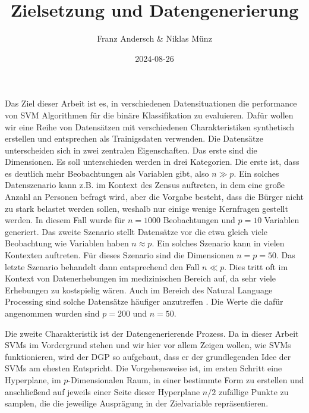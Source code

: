 \documentclass[
]{article}
\title{Zielsetzung und Datengenerierung}
\author{Franz Andersch \& Niklas Münz}
\date{2024-08-26}
\renewcommand{\maketitle}{}
\begin{document}
\maketitle

Das Ziel dieser Arbeit ist es, in verschiedenen Datensituationen die
performance von SVM Algorithmen für die binäre Klassifikation zu
evaluieren. Dafür wollen wir eine Reihe von Datensätzen mit
verschiedenen Charakteristiken synthetisch erstellen und entsprechen als
Trainigsdaten verwenden. Die Datensätze unterscheiden sich in zwei
zentralen Eigenschaften. Das erste sind die Dimensionen. Es soll
unterschieden werden in drei Kategorien. Die erste ist, dass es deutlich
mehr Beobachtungen als Variablen gibt, also \(n \gg p\). Ein solches
Datenszenario kann z.B. im Kontext des Zensus auftreten, in dem eine
große Anzahl an Personen befragt wird, aber die Vorgabe besteht, dass
die Bürger nicht zu stark belastet werden sollen, weshalb nur einige
wenige Kernfragen gestellt werden. In diesem Fall wurde für \(n=1000\)
Beobachtungen und \(p=10\) Variablen generiert. Das zweite Szenario
stellt Datensätze vor die etwa gleich viele Beobachtung wie Variablen
haben \(n \approx p\). Ein solches Szenario kann in vielen Kontexten
auftreten. Für dieses Szenario sind die Dimensionen \(n=p=50\). Das
letzte Szenario behandelt dann entsprechend den Fall \(n \ll p\). Dies
tritt oft im Kontext von Datenerhebungen im medizinischen Bereich auf,
da sehr viele Erhebungen zu kostspielig wären. Auch im Bereich des
Natural Language Processing sind solche Datensätze häufiger anzutreffen
\parencite{scholzComparisonClassificationMethods2021}. Die Werte die
dafür angenommen wurden sind \(p=200\) und \(n=50\).

Die zweite Charakteristik ist der Datengenerierende Prozess. Da in
dieser Arbeit SVMs im Vordergrund stehen und wir hier vor allem Zeigen
wollen, wie SVMs funktionieren, wird der DGP so aufgebaut, dass er der
grundlegenden Idee der SVMs am ehesten Entspricht. Die Vorgehensweise
ist, im ersten Schritt eine Hyperplane, im \(p\)-Dimensionalen Raum, in
einer bestimmte Form zu erstellen und anschließend auf jeweils einer
Seite dieser Hyperplane \(n/2\) zufällige Punkte zu samplen, die die
jeweilige Ausprägung in der Zielvariable repräsentieren.
\end{document}
